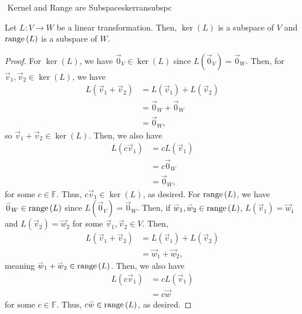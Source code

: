         \begin{theorem}{\Stop\,\,Kernel and Range are Subspaces}{kerransubspc}

            Let \(L:V\to W\) be a linear transformation. Then, \(\ker(L)\) is a subspace of \(V\) and \(\text{range\,}(L)\) is a subspace of \(W\).
            \begin{proof}
                For \(\ker(L)\), we have \(\vec{0}_V\in\ker(L)\) since \(L(\vec{0}_V)=\vec{0}_W\). Then, for \(\vec{v}_1,\vec{v}_2\in \ker(L)\), we have
                \begin{align*}
                    L(\vec{v}_1+\vec{v}_2)&=L(\vec{v}_1)+L(\vec{v}_2) \\
                    &=\vec{0}_W+\vec{0}_W \\
                    &=\vec{0}_W,
                \end{align*}
                so \(\vec{v}_1+\vec{v}_2\in\ker(L)\). Then, we also have
                \begin{align*}
                    L(c\vec{v}_1)&=cL(\vec{v}_1) \\
                    &=c\vec{0}_W \\
                    &=\vec{0}_W,
                \end{align*}
                for some \(c\in\mathbb{F}\). Thus, \(c\vec{v}_1\in\ker(L)\), as desired. For \(\text{range\,}(L)\), we have \(\overset{_{\rightharpoonup}}{0}_W\in\text{range\,}(L)\) since \(L(\vec{0}_V)=\vec{0}_W\). Then, if \(\overset{_{\rightharpoonup}}{w}_1,\overset{_{\rightharpoonup}}{w}_2\in\text{range\,}(L)\), \(L(\vec{v}_1)=\vec{w}_1\) and \(L(\vec{v}_2)=\vec{w}_2\) for some \(\vec{v}_1,\vec{v}_2\in V\). Then,
                \begin{align*}
                    L(\vec{v}_1+\vec{v}_2)&=L(\vec{v}_1)+L(\vec{v}_2) \\
                    &=\vec{w}_1+\vec{w}_2,
                \end{align*}
                meaning \(\overset{_{\rightharpoonup}}{w}_1+\overset{_{\rightharpoonup}}{w}_2\in \text{range\,}(L)\). Then, we also have
                \begin{align*}
                    L(c\vec{v}_1)&=cL(\vec{v}_1) \\
                    &=c\vec{w}
                \end{align*}
                for some \(c\in\mathbb{F}\). Thus, \(c\overset{_{\rightharpoonup}}{w}\in\text{range\,}(L)\), as desired.
            \end{proof}
        
        \end{theorem}
        \pagebreak
        \vphantom
        \\
